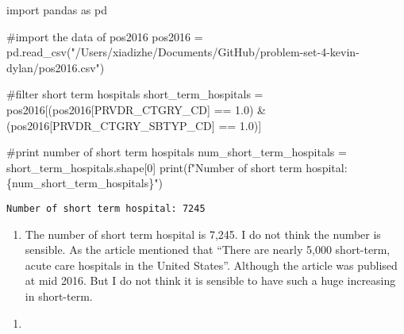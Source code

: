 \documentclass[
  letterpaper,
  DIV=11,
  numbers=noendperiod]{scrartcl}
\newenvironment{Shaded}{\begin{snugshade}}{\end{snugshade}}
\newcommand{\BuiltInTok}[1]{\textcolor[rgb]{0.00,0.23,0.31}{#1}}
\newcommand{\CommentTok}[1]{\textcolor[rgb]{0.37,0.37,0.37}{#1}}
\newcommand{\DecValTok}[1]{\textcolor[rgb]{0.68,0.00,0.00}{#1}}
\newcommand{\FloatTok}[1]{\textcolor[rgb]{0.68,0.00,0.00}{#1}}
\newcommand{\ImportTok}[1]{\textcolor[rgb]{0.00,0.46,0.62}{#1}}
\newcommand{\NormalTok}[1]{\textcolor[rgb]{0.00,0.23,0.31}{#1}}
\newcommand{\OperatorTok}[1]{\textcolor[rgb]{0.37,0.37,0.37}{#1}}
\newcommand{\SpecialCharTok}[1]{\textcolor[rgb]{0.37,0.37,0.37}{#1}}
\newcommand{\SpecialStringTok}[1]{\textcolor[rgb]{0.13,0.47,0.30}{#1}}
\newcommand{\StringTok}[1]{\textcolor[rgb]{0.13,0.47,0.30}{#1}}
\providecommand{\tightlist}{%
  \setlength{\itemsep}{0pt}\setlength{\parskip}{0pt}}\usepackage{longtable,booktabs,array}
\begin{document}
\begin{Shaded}
\begin{Highlighting}[]
\ImportTok{import}\NormalTok{ pandas }\ImportTok{as}\NormalTok{ pd}

\CommentTok{\#import the data of pos2016}
\NormalTok{pos2016 }\OperatorTok{=}\NormalTok{ pd.read\_csv(}\StringTok{"/Users/xiadizhe/Documents/GitHub/problem{-}set{-}4{-}kevin{-}dylan/pos2016.csv"}\NormalTok{)}

\CommentTok{\#filter short term hospitals}
\NormalTok{short\_term\_hospitals }\OperatorTok{=}\NormalTok{ pos2016[(pos2016[}\StringTok{\textquotesingle{}PRVDR\_CTGRY\_CD\textquotesingle{}}\NormalTok{] }\OperatorTok{==} \FloatTok{1.0}\NormalTok{) }\OperatorTok{\&}\NormalTok{ (pos2016[}\StringTok{\textquotesingle{}PRVDR\_CTGRY\_SBTYP\_CD\textquotesingle{}}\NormalTok{] }\OperatorTok{==} \FloatTok{1.0}\NormalTok{)]}

\CommentTok{\#print number of short term hospitals}
\NormalTok{num\_short\_term\_hospitals }\OperatorTok{=}\NormalTok{ short\_term\_hospitals.shape[}\DecValTok{0}\NormalTok{]}
\BuiltInTok{print}\NormalTok{(}\SpecialStringTok{f"Number of short term hospital: }\SpecialCharTok{\{}\NormalTok{num\_short\_term\_hospitals}\SpecialCharTok{\}}\SpecialStringTok{"}\NormalTok{)}
\end{Highlighting}
\end{Shaded}

\begin{verbatim}
Number of short term hospital: 7245
\end{verbatim}

\begin{enumerate}
\def\labelenumi{\alph{enumi}.}
\setcounter{enumi}{1}
\tightlist
\item
  The number of short term hospital is 7,245. I do not think the number
  is sensible. As the article mentioned that ``There are nearly 5,000
  short-term, acute care hospitals in the United States''. Although the
  article was publised at mid 2016. But I do not think it is sensible to
  have such a huge increasing in short-term.
\end{enumerate}

\begin{enumerate}
\def\labelenumi{\arabic{enumi}.}
\setcounter{enumi}{2}
\tightlist
\item
\end{enumerate}
\end{document}
